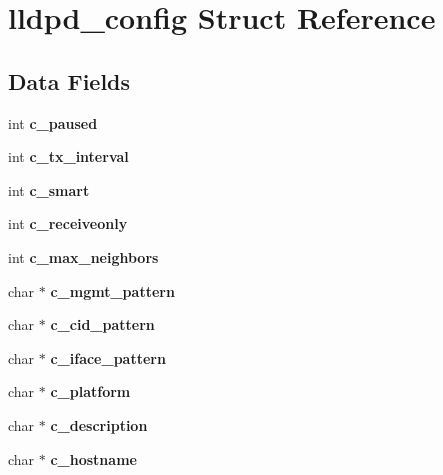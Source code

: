 \section{lldpd\-\_\-config \-Struct \-Reference}
\label{structlldpd__config}
\subsection*{\-Data \-Fields}
\begin{DoxyCompactItemize}
\item 
int {\bfseries c\-\_\-paused}\label{structlldpd__config_adf28c03e56ea14df28549cd6d2c85a21}

\item 
int {\bfseries c\-\_\-tx\-\_\-interval}\label{structlldpd__config_a43e9a9e26caf02aea5e9e6e8dcd2b698}

\item 
int {\bfseries c\-\_\-smart}\label{structlldpd__config_a0ff5654af6d04ebb582115add6725480}

\item 
int {\bfseries c\-\_\-receiveonly}\label{structlldpd__config_a5a82ecd9b177db8300efc5761cbac51a}

\item 
int {\bfseries c\-\_\-max\-\_\-neighbors}\label{structlldpd__config_ad05d4d9764d75a94c51236897f548c0f}

\item 
char $\ast$ {\bfseries c\-\_\-mgmt\-\_\-pattern}\label{structlldpd__config_ac83f16b1f694418a351ca33622c56ca0}

\item 
char $\ast$ {\bfseries c\-\_\-cid\-\_\-pattern}\label{structlldpd__config_ac3651b61a7702b942eddc8e9e6437698}

\item 
char $\ast$ {\bfseries c\-\_\-iface\-\_\-pattern}\label{structlldpd__config_afbb8de3296655f1a3ff31d9b62f1149f}

\item 
char $\ast$ {\bfseries c\-\_\-platform}\label{structlldpd__config_a6b583216c79263c0c2656fb690fdb68d}

\item 
char $\ast$ {\bfseries c\-\_\-description}\label{structlldpd__config_a3b48778b6860ebcdbfc7286d8e81ce8c}

\item 
char $\ast$ {\bfseries c\-\_\-hostname}\label{structlldpd__config_a10f7323b5dee8b26ea776aff806c408b}


\end{DoxyCompactItemize}
